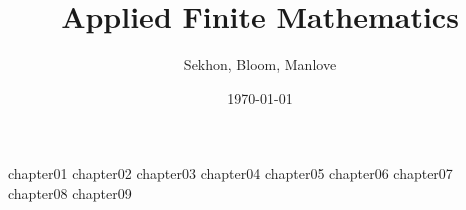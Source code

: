 \documentclass[12pt]{book}
\begin{document}

\frontmatter
\title{Applied Finite Mathematics}
\author{Sekhon, Bloom, Manlove}
\date{\today}
\maketitle
\tableofcontents

\mainmatter
{chapter01}
{chapter02}
{chapter03}
{chapter04}
{chapter05}
{chapter06}
{chapter07}
{chapter08}
{chapter09}


\backmatter
\end{document}
